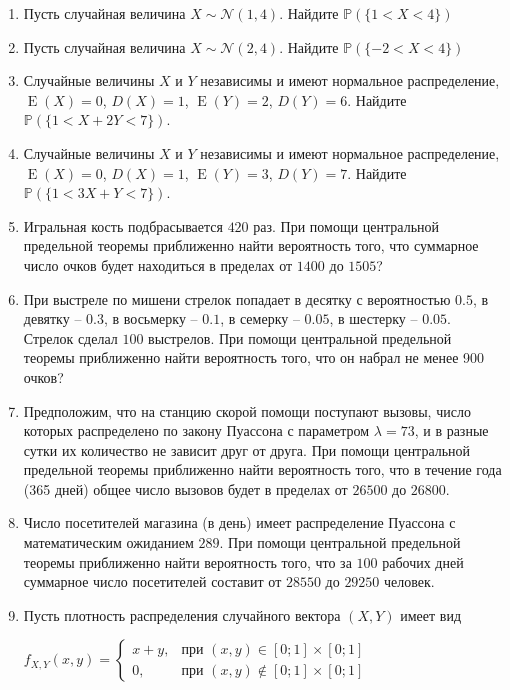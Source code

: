 \documentclass[12pt]{article}
\DeclareMathOperator{\E}{E}
\def \cN{\mathcal{N}}
\def \P{\mathbb{P}}
\begin{document}
\begin{enumerate}
\item Пусть случайная величина $X \sim \cN(1,4)$. Найдите $\P(\{1<X<4\})$

\item Пусть случайная величина $X \sim \cN(2,4)$. Найдите $\P(\{-2<X<4\})$ 

\item Случайные величины $X$ и $Y$ независимы и  имеют нормальное распределение, $\E(X) = 0 $, $D(X) = 1$, $\E(Y) = 2$, $D(Y) = 6$. Найдите $\P(\{1 < X + 2Y < 7\})$.

\item Случайные величины $X$ и $Y$ независимы и  имеют нормальное распределение, $\E(X) = 0 $, $D(X) = 1$, $\E(Y) = 3$, $D(Y) = 7$. Найдите $\P(\{1 < 3X + Y < 7\})$. 

\item Игральная кость подбрасывается $420$ раз. При помощи центральной предельной теоремы приближенно найти вероятность того, что суммарное число очков будет находиться в пределах от $1400$ до $1505$?  

\item При выстреле по мишени стрелок попадает в десятку с вероятностью $0.5$, в девятку – $0.3$, в восьмерку – $0.1$, в семерку – $0.05$, в шестерку – $0.05$.
Стрелок сделал $100$ выстрелов. При помощи центральной предельной теоремы приближенно найти вероятность того, что он набрал не менее 900 очков? 

\item Предположим, что на станцию скорой помощи поступают вызовы, число которых распределено по закону Пуассона с параметром $\lambda = 73$, и в разные сутки их количество не зависит друг от друга. При помощи центральной предельной теоремы приближенно найти вероятность того, что в течение года (365 дней) общее число вызовов будет в пределах от $26500$ до $26800$. 

\item Число посетителей магазина (в день) имеет распределение Пуассона с математическим ожиданием $289$. При помощи центральной предельной теоремы приближенно найти вероятность того, что за $100$ рабочих дней суммарное число посетителей составит от $28550$ до $29250$ человек. 

\item Пусть плотность распределения случайного вектора $(X,Y)$ имеет вид
\begin{center} $f_{X,Y}(x,y) = \begin{cases} x+y, & \mbox{при } (x,y) \in [0;1] \times [0;1] \\ 0 , & \mbox{при } (x,y) \not\in [0;1] \times [0;1] \end{cases}$  \end{center}


\end{enumerate}
\end{document}
